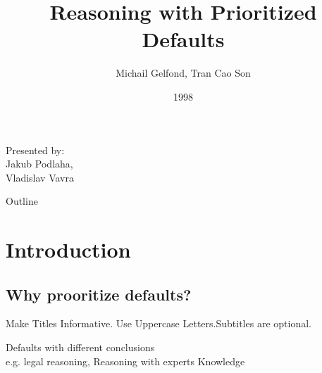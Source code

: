 \documentclass{beamer}
\title[Short Paper Title] %
{Reasoning with Prioritized Defaults}
\author[Michail Gelfond, Tran Cao Son] %
{Michail Gelfond, Tran Cao Son}
\institute[Universities of Somewhere and Elsewhere] %
{
  Computer Science Department\\
  University of Texas at El Paso
}
\date[Short Occasion] %
{1998}
\begin{document}
\begin{frame}
  \titlepage

\begin{center}
\vspace{-30pt}
Presented by: \\
Jakub Podlaha, \\
Vladislav Vavra
\end{center}

\end{frame}

\begin{frame}{Outline}
  \tableofcontents
\end{frame}




\section{Introduction}

\subsection[Motivation]{Why prooritize defaults?}

\begin{frame}{Make Titles Informative. Use Uppercase Letters.}{Subtitles are optional.}

Defaults with different conclusions\\
e.g. legal reasoning, Reasoning with experts Knowledge

\end{frame}
\end{document}
